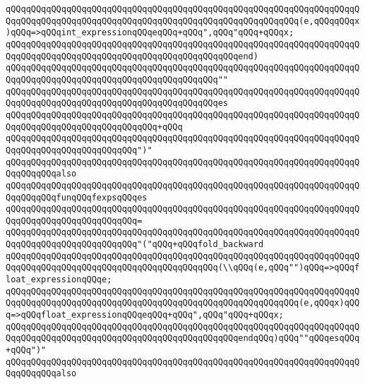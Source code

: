 \verb|qQQqqQQqqQQqqQQqqQQqqQQqqQQqqQQqqQQqqQQqqQQqqQQqqQQqqQQqqQQqqQQqqQQqqQQqqQQqqQQqqQQqqQQqqQQqqQQqqQQqqQQqqQQqqQQqqQQqqQQqqQQqqQQq(e,qQQqqQQqx)qQQq=>qQQqint_expressionqQQqeqQQq+qQQq",qQQq"qQQq+qQQqx;|\newline
\verb|qQQqqQQqqQQqqQQqqQQqqQQqqQQqqQQqqQQqqQQqqQQqqQQqqQQqqQQqqQQqqQQqqQQqqQQqqQQqqQQqqQQqqQQqqQQqqQQqqQQqqQQqqQQqqQQqqQQqend)|\newline
\verb|qQQqqQQqqQQqqQQqqQQqqQQqqQQqqQQqqQQqqQQqqQQqqQQqqQQqqQQqqQQqqQQqqQQqqQQqqQQqqQQqqQQqqQQqqQQqqQQqqQQqqQQqqQQqqQQq""|\newline
\verb|qQQqqQQqqQQqqQQqqQQqqQQqqQQqqQQqqQQqqQQqqQQqqQQqqQQqqQQqqQQqqQQqqQQqqQQqqQQqqQQqqQQqqQQqqQQqqQQqqQQqqQQqqQQqqQQqes|\newline
\verb|qQQqqQQqqQQqqQQqqQQqqQQqqQQqqQQqqQQqqQQqqQQqqQQqqQQqqQQqqQQqqQQqqQQqqQQqqQQqqQQqqQQqqQQqqQQqqQQqqQQq+qQQq|\newline
\verb|qQQqqQQqqQQqqQQqqQQqqQQqqQQqqQQqqQQqqQQqqQQqqQQqqQQqqQQqqQQqqQQqqQQqqQQqqQQqqQQqqQQqqQQqqQQqqQQq")"|\newline
\newline
\verb|qQQqqQQqqQQqqQQqqQQqqQQqqQQqqQQqqQQqqQQqqQQqqQQqqQQqqQQqqQQqqQQqqQQqqQQqqQQqqQQqalso|\newline
\verb|qQQqqQQqqQQqqQQqqQQqqQQqqQQqqQQqqQQqqQQqqQQqqQQqqQQqqQQqqQQqqQQqqQQqqQQqqQQqqQQqfunqQQqfexpsqQQqes|\newline
\verb|qQQqqQQqqQQqqQQqqQQqqQQqqQQqqQQqqQQqqQQqqQQqqQQqqQQqqQQqqQQqqQQqqQQqqQQqqQQqqQQqqQQqqQQqqQQqqQQq=|\newline
\verb|qQQqqQQqqQQqqQQqqQQqqQQqqQQqqQQqqQQqqQQqqQQqqQQqqQQqqQQqqQQqqQQqqQQqqQQqqQQqqQQqqQQqqQQqqQQqqQQq"("qQQq+qQQqfold_backward|\newline
\verb|qQQqqQQqqQQqqQQqqQQqqQQqqQQqqQQqqQQqqQQqqQQqqQQqqQQqqQQqqQQqqQQqqQQqqQQqqQQqqQQqqQQqqQQqqQQqqQQqqQQqqQQqqQQqqQQq(\\qQQq(e,qQQq"")qQQq=>qQQqfloat_expressionqQQqe;|\newline
\verb|qQQqqQQqqQQqqQQqqQQqqQQqqQQqqQQqqQQqqQQqqQQqqQQqqQQqqQQqqQQqqQQqqQQqqQQqqQQqqQQqqQQqqQQqqQQqqQQqqQQqqQQqqQQqqQQqqQQqqQQqqQQqqQQq(e,qQQqx)qQQq=>qQQqfloat_expressionqQQqeqQQq+qQQq",qQQq"qQQq+qQQqx;|\newline
\verb|qQQqqQQqqQQqqQQqqQQqqQQqqQQqqQQqqQQqqQQqqQQqqQQqqQQqqQQqqQQqqQQqqQQqqQQqqQQqqQQqqQQqqQQqqQQqqQQqqQQqqQQqqQQqqQQqqQQqendqQQq)qQQq""qQQqesqQQq+qQQq")"|\newline
\verb|qQQqqQQqqQQqqQQqqQQqqQQqqQQqqQQqqQQqqQQqqQQqqQQqqQQqqQQqqQQqqQQqqQQqqQQqqQQqqQQqalso|\newline
